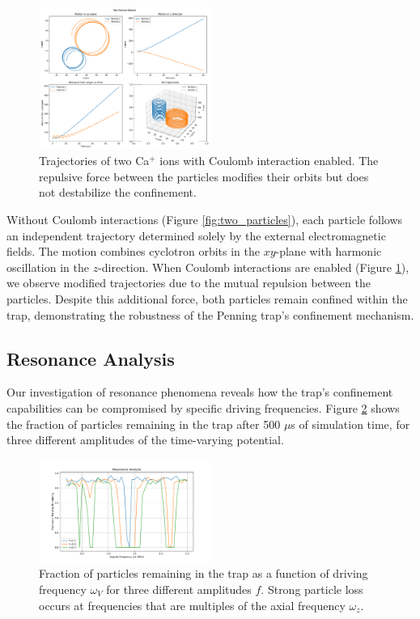 \documentclass[english,notitlepage,reprint,nofootinbib]{revtex4-2}  %
\begin{document}
\begin{figure}[h!]
    \centering
    \includegraphics[width=0.5\textwidth]{build/figures/two_particles_motion_two_particles_with_interaction.pdf}
    \caption{Trajectories of two Ca$^+$ ions with Coulomb interaction enabled. The repulsive force between the particles modifies their orbits but does not destabilize the confinement.}
    \label{fig:two_particles_coulomb}
\end{figure}

Without Coulomb interactions (Figure \ref{fig:two_particles}), each particle follows an independent trajectory determined solely by the external electromagnetic fields. The motion combines cyclotron orbits in the $xy$-plane with harmonic oscillation in the $z$-direction. When Coulomb interactions are enabled (Figure \ref{fig:two_particles_coulomb}), we observe modified trajectories due to the mutual repulsion between the particles. Despite this additional force, both particles remain confined within the trap, demonstrating the robustness of the Penning trap's confinement mechanism.

\subsection{Resonance Analysis}

Our investigation of resonance phenomena reveals how the trap's confinement capabilities can be compromised by specific driving frequencies. Figure \ref{fig:resonance} shows the fraction of particles remaining in the trap after 500 $\mu$s of simulation time, for three different amplitudes of the time-varying potential.

\begin{figure}[h!]
    \centering
    \includegraphics[width=0.5\textwidth]{build/figures/resonance_analysis.pdf}
    \caption{Fraction of particles remaining in the trap as a function of driving frequency $\omega_V$ for three different amplitudes $f$. Strong particle loss occurs at frequencies that are multiples of the axial frequency $\omega_z$.}
    \label{fig:resonance}
\end{figure}
\end{document}
